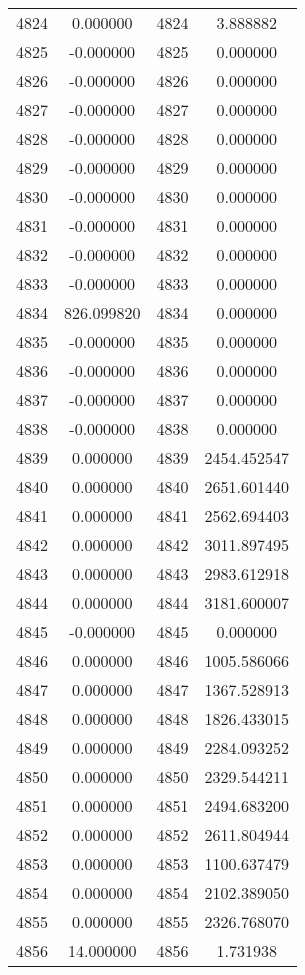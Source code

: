 \documentclass[12pt]{article}
\begin{document}
\begin{longtable}{@{}cccc@{}}
4824 & 0.000000 & 4824 & 3.888882 \\
4825 & -0.000000 & 4825 & 0.000000 \\
4826 & -0.000000 & 4826 & 0.000000 \\
4827 & -0.000000 & 4827 & 0.000000 \\
4828 & -0.000000 & 4828 & 0.000000 \\
4829 & -0.000000 & 4829 & 0.000000 \\
4830 & -0.000000 & 4830 & 0.000000 \\
4831 & -0.000000 & 4831 & 0.000000 \\
4832 & -0.000000 & 4832 & 0.000000 \\
4833 & -0.000000 & 4833 & 0.000000 \\
4834 & 826.099820 & 4834 & 0.000000 \\
4835 & -0.000000 & 4835 & 0.000000 \\
4836 & -0.000000 & 4836 & 0.000000 \\
4837 & -0.000000 & 4837 & 0.000000 \\
4838 & -0.000000 & 4838 & 0.000000 \\
4839 & 0.000000 & 4839 & 2454.452547 \\
4840 & 0.000000 & 4840 & 2651.601440 \\
4841 & 0.000000 & 4841 & 2562.694403 \\
4842 & 0.000000 & 4842 & 3011.897495 \\
4843 & 0.000000 & 4843 & 2983.612918 \\
4844 & 0.000000 & 4844 & 3181.600007 \\
4845 & -0.000000 & 4845 & 0.000000 \\
4846 & 0.000000 & 4846 & 1005.586066 \\
4847 & 0.000000 & 4847 & 1367.528913 \\
4848 & 0.000000 & 4848 & 1826.433015 \\
4849 & 0.000000 & 4849 & 2284.093252 \\
4850 & 0.000000 & 4850 & 2329.544211 \\
4851 & 0.000000 & 4851 & 2494.683200 \\
4852 & 0.000000 & 4852 & 2611.804944 \\
4853 & 0.000000 & 4853 & 1100.637479 \\
4854 & 0.000000 & 4854 & 2102.389050 \\
4855 & 0.000000 & 4855 & 2326.768070 \\
4856 & 14.000000 & 4856 & 1.731938 \\

\end{longtable}
\end{document}
